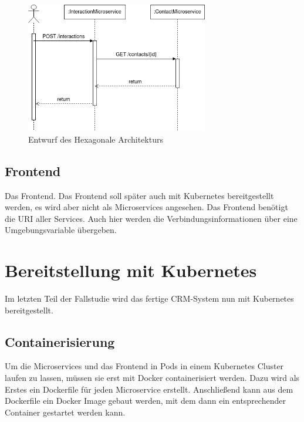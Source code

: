 \begin{figure}[H] 
    \centering
    \includegraphics[width=0.71\textwidth]{figures/UMLSequenzdiagramm.png}
    \caption{Entwurf des \acp{Hexagonale Architektur}}
    \label{fig:CRMENTWURF}
\end{figure}

\subsection{Frontend}

Das Frontend. Das Frontend soll später auch mit Kubernetes bereitgestellt werden, es wird aber nicht als Microservices angesehen. Das Frontend benötigt die \ac{URI} aller Services. Auch hier werden die Verbindungsinformationen über eine Umgebungsvariable übergeben.

\clearpage
\section{Bereitstellung mit Kubernetes}

Im letzten Teil der Fallstudie wird das fertige CRM-System nun mit Kubernetes bereitgestellt.

\subsection{Containerisierung}

Um die Microservices und das Frontend in Pods in einem Kubernetes Cluster laufen zu lassen, müssen sie erst mit Docker containerisiert werden. Dazu wird als Erstes ein Dockerfile für jeden Microservice erstellt. Anschließend kann aus dem Dockerfile ein Docker Image gebaut werden, mit dem dann ein entsprechender Container gestartet werden kann. \\
\\

